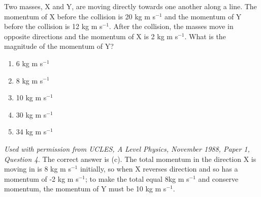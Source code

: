 

\begin{problem}
{Two masses, X and Y, are moving directly towards one another along a line. The momentum of X before the collision is 20 kg m s$^{-1}$ and the momentum of Y before the collision is 12 kg m s$^{-1}$. After the collision, the masses move in opposite directions and the momentum of X is 2 kg m s$^{-1}$. What is the magnitude of the momentum of Y?
\begin{enumerate}
	\item 6 kg m s$^{-1}$
	\item 8 kg m s$^{-1}$
	\item 10 kg m s$^{-1}$
	\item 30 kg m s$^{-1}$
	\item 34 kg m s$^{-1}$
\end{enumerate}
}
{\textit{Used with permission from UCLES, A Level Physics, November 1988, Paper 1, Question 4.}}
{The correct answer is (c). The total momentum in the direction X is moving in is 8 kg m s$^{-1}$ initially, so when X reverses direction and so has a momentum of -2 kg m s$^{-1}$; to make the total equal 8kg m s$^{-1}$ and conserve momentum, the momentum of Y must be 10 kg m s$^{-1}$.}
\end{problem}
